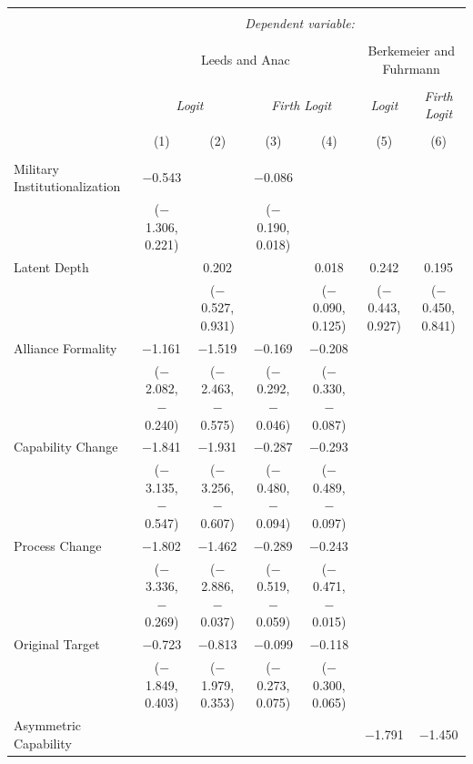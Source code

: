 \documentclass[12pt]{article}
\begin{document}
\begin{table}[!htbp] \centering 
\begin{adjustbox}{width= .95\textwidth, center}
\begin{tabular}{@{\extracolsep{5pt}}lcccccc} 
\\[-1.8ex]\hline 
\hline \\[-1.8ex] 
 & \multicolumn{6}{c}{\textit{Dependent variable:}} \\ 
\cline{2-7} 
\\[-1.8ex] & \multicolumn{4}{c}{Leeds and Anac} & \multicolumn{2}{c}{Berkemeier and Fuhrmann} \\ 
\\[-1.8ex] & \multicolumn{2}{c}{\textit{Logit}} & \multicolumn{2}{c}{\textit{Firth Logit}} & \textit{Logit} & \textit{Firth Logit} \\ 
\\[-1.8ex] & (1) & (2) & (3) & (4) & (5) & (6)\\ 
\hline \\[-1.8ex] 
 Military Institutionalization & $-$0.543 &  & $-$0.086 &  &  &  \\ 
  & ($-$1.306, 0.221) &  & ($-$0.190, 0.018) &  &  &  \\ 
  Latent Depth &  & 0.202 &  & 0.018 & 0.242 & 0.195 \\ 
  &  & ($-$0.527, 0.931) &  & ($-$0.090, 0.125) & ($-$0.443, 0.927) & ($-$0.450, 0.841) \\ 
  Alliance Formality & $-$1.161$^{}$ & $-$1.519$^{}$ & $-$0.169$^{}$ & $-$0.208$^{}$ &  &  \\ 
  & ($-$2.082, $-$0.240) & ($-$2.463, $-$0.575) & ($-$0.292, $-$0.046) & ($-$0.330, $-$0.087) &  &  \\ 
  Capability Change & $-$1.841$^{}$ & $-$1.931$^{}$ & $-$0.287$^{}$ & $-$0.293$^{}$ &  &  \\ 
  & ($-$3.135, $-$0.547) & ($-$3.256, $-$0.607) & ($-$0.480, $-$0.094) & ($-$0.489, $-$0.097) &  &  \\ 
  Process Change & $-$1.802$^{}$ & $-$1.462$^{}$ & $-$0.289$^{}$ & $-$0.243$^{}$ &  &  \\ 
  & ($-$3.336, $-$0.269) & ($-$2.886, $-$0.037) & ($-$0.519, $-$0.059) & ($-$0.471, $-$0.015) &  &  \\ 
  Original Target & $-$0.723 & $-$0.813 & $-$0.099 & $-$0.118 &  &  \\ 
  & ($-$1.849, 0.403) & ($-$1.979, 0.353) & ($-$0.273, 0.075) & ($-$0.300, 0.065) &  &  \\ 
  Asymmetric Capability &  &  &  &  & $-$1.791 & $-$1.450 \\ 

\end{tabular}
\end{adjustbox}
\end{table}
\end{document}
